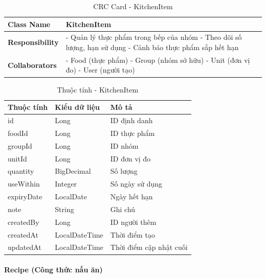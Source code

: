\begin{table}[H]
\small
\renewcommand{\arraystretch}{1.3}
\begin{tabularx}{\textwidth}{|>{\raggedright\arraybackslash}p{3.5cm}|X|}
\hline
\rowcolor{gray!20}
\textbf{Class Name} & KitchenItem \\
\hline
\textbf{Responsibility} & - Quản lý thực phẩm trong bếp của nhóm \newline - Theo dõi số lượng, hạn sử dụng \newline - Cảnh báo thực phẩm sắp hết hạn \\
\hline
\textbf{Collaborators} & - Food (thực phẩm) \newline - Group (nhóm sở hữu) \newline - Unit (đơn vị đo) \newline - User (người tạo) \\
\hline
\end{tabularx}
\caption{CRC Card - KitchenItem}
\end{table}

\begin{table}[H]
\small
\renewcommand{\arraystretch}{1.3}
\begin{tabularx}{\textwidth}{|>{\raggedright\arraybackslash}p{3cm}|>{\raggedright\arraybackslash}p{3cm}|X|}
\hline
\rowcolor{gray!20}
\textbf{Thuộc tính} & \textbf{Kiểu dữ liệu} & \textbf{Mô tả} \\
\hline
id & Long & ID định danh \\
\hline
foodId & Long & ID thực phẩm \\
\hline
groupId & Long & ID nhóm \\
\hline
unitId & Long & ID đơn vị đo \\
\hline
quantity & BigDecimal & Số lượng \\
\hline
useWithin & Integer & Số ngày sử dụng \\
\hline
expiryDate & LocalDate & Ngày hết hạn \\
\hline
note & String & Ghi chú \\
\hline
createdBy & Long & ID người thêm \\
\hline
createdAt & LocalDateTime & Thời điểm tạo \\
\hline
updatedAt & LocalDateTime & Thời điểm cập nhật cuối \\
\hline
\end{tabularx}
\caption{Thuộc tính - KitchenItem}
\end{table}

\paragraph{Recipe (Công thức nấu ăn)} ~\\

